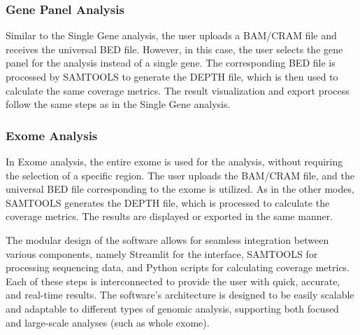 \subsubsection{\textbf{Gene Panel Analysis}}

Similar to the Single Gene analysis, the user uploads a BAM/CRAM file and receives the universal BED file. However, in this case, the user selects the gene panel for the analysis instead of a single gene. The corresponding BED file is processed by SAMTOOLS to generate the DEPTH file, which is then used to calculate the same coverage metrics. The result visualization and export process follow the same steps as in the Single Gene analysis.


\subsubsection{\textbf{Exome Analysis}}

In Exome analysis, the entire exome is used for the analysis, without requiring the selection of a specific region. The user uploads the BAM/CRAM file, and the universal BED file corresponding to the exome is utilized. As in the other modes, SAMTOOLS generates the DEPTH file, which is processed to calculate the coverage metrics. The results are displayed or exported in the same manner.


The modular design of the software allows for seamless integration between various components, namely Streamlit for the interface, SAMTOOLS for processing sequencing data, and Python scripts for calculating coverage metrics. Each of these steps is interconnected to provide the user with quick, accurate, and real-time results. The software's architecture is designed to be easily scalable and adaptable to different types of genomic analysis, supporting both focused and large-scale analyses (such as whole exome).

